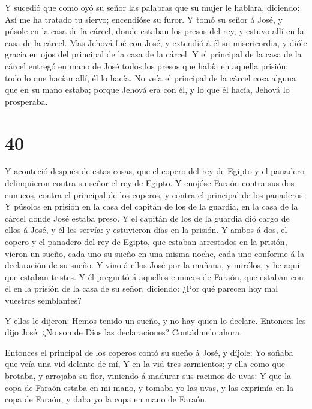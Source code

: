  Y sucedió que como oyó su señor las palabras que su mujer
le hablara, diciendo: Así me ha tratado tu siervo; encendióse su furor.
 Y tomó su señor á José, y púsole en la casa de la cárcel,
donde estaban los presos del rey, y estuvo allí en la casa de la cárcel.
 Mas Jehová fué con José, y extendió á él su misericordia,
y dióle gracia en ojos del principal de la casa de la cárcel.
 Y el principal de la casa de la cárcel entregó en mano de
José todos los presos que había en aquella prisión; todo lo que hacían
allí, él lo hacía.  No veía el principal de la cárcel cosa
alguna que en su mano estaba; porque Jehová era con él, y lo que él
hacía, Jehová lo prosperaba.

\hypertarget{section-39}{%
\section{40}\label{section-39}}

 Y aconteció después de estas cosas, que el copero del rey
de Egipto y el panadero delinquieron contra su señor el rey de Egipto.
 Y enojóse Faraón contra sus dos eunucos, contra el
principal de los coperos, y contra el principal de los panaderos:
 Y púsolos en prisión en la casa del capitán de los de la
guardia, en la casa de la cárcel donde José estaba preso.  Y
el capitán de los de la guardia dió cargo de ellos á José, y él les
servía: y estuvieron días en la prisión.  Y ambos á dos, el
copero y el panadero del rey de Egipto, que estaban arrestados en la
prisión, vieron un sueño, cada uno su sueño en una misma noche, cada uno
conforme á la declaración de su sueño.  Y vino á ellos José
por la mañana, y mirólos, y he aquí que estaban tristes.  Y
él preguntó á aquellos eunucos de Faraón, que estaban con él en la
prisión de la casa de su señor, diciendo: ¿Por qué parecen hoy mal
vuestros semblantes?

 Y ellos le dijeron: Hemos tenido un sueño, y no hay quien
lo declare. Entonces les dijo José: ¿No son de Dios las declaraciones?
Contádmelo ahora.

 Entonces el principal de los coperos contó su sueño á José,
y díjole: Yo soñaba que veía una vid delante de mí,  Y en
la vid tres sarmientos; y ella como que brotaba, y arrojaba su flor,
viniendo á madurar sus racimos de uvas:  Y que la copa de
Faraón estaba en mi mano, y tomaba yo las uvas, y las exprimía en la
copa de Faraón, y daba yo la copa en mano de Faraón.

